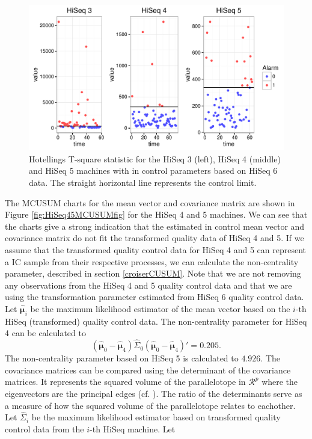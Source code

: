 \documentclass[a4paper,11pt,fleqn,twoside,notitlepage]{report}\usepackage[]{graphicx}\usepackage[]{color}
\makeatletter
\def\maxwidth{ %
  \ifdim\Gin@nat@width>\linewidth
    \linewidth
  \else
    \Gin@nat@width
  \fi
}
\newenvironment{knitrout}{}{} %
\makeatother
\begin{document}
\begin{knitrout}
\color{fgcolor}\begin{figure}[!ht]
\includegraphics[width=\maxwidth]{figure/HiSeqPhase2Hotelling-1} \caption[Hotellings T-square statistic for the HiSeq 3 (left), HiSeq 4 (middle) and HiSeq 5 machines with in control parameters based on HiSeq 6 data]{Hotellings T-square statistic for the HiSeq 3 (left), HiSeq 4 (middle) and HiSeq 5 machines with in control parameters based on HiSeq 6 data. The straight horizontal line represents the control limit.}\label{fig:HiSeqPhase2Hotelling}
\end{figure}


\end{knitrout}
The MCUSUM charts for the mean vector and covariance matrix are shown in Figure \ref{fig:HiSeq45MCUSUMfig} for the HiSeq 4 and 5 machines. We can see that the charts give a strong indication that the estimated in control mean vector and covariance matrix do not fit the transformed quality data of HiSeq 4 and 5. If we assume that the transformed quality control data for HiSeq 4 and 5 can represent a IC sample from their respective processes, we can calculate the non-centrality parameter, described in section \ref{croiserCUSUM}. Note that we are not removing any observations from the HiSeq 4 and 5 quality control data and that we are using the transformation parameter estimated from HiSeq 6 quality control data. Let $\hat{\boldsymbol{\mu}}_{i}$ be the maximum likelihood estimator of the mean vector based on the $i$-th HiSeq (transformed) quality control data. The non-centrality parameter for HiSeq 4 can be calculated to 
$$
(\hat{\boldsymbol{\mu}}_{0}-\hat{\boldsymbol{\mu}}_{4})\widehat{\Sigma}_0(\hat{\boldsymbol{\mu}}_{0}-\hat{\boldsymbol{\mu}}_{4})'=0.205.
$$
The non-centrality parameter based on HiSeq 5 is calculated to $4.926$. The covariance matrices can be compared using the determinant of the covariance matrices. It represents the squared volume of the parallelotope in $\mathcal{R}^p$ where the eigenvectors are the principal edges (cf. \citet[page 385]{MultStatAnalysis}). The ratio of the determinants serve as a measure of how the squared volume of the parallelotope relates to eachother. Let $\widehat{\Sigma}_i$ be the maximum likelihood estimator based on transformed quality control data from the $i$-th HiSeq machine. Let
\end{document}
